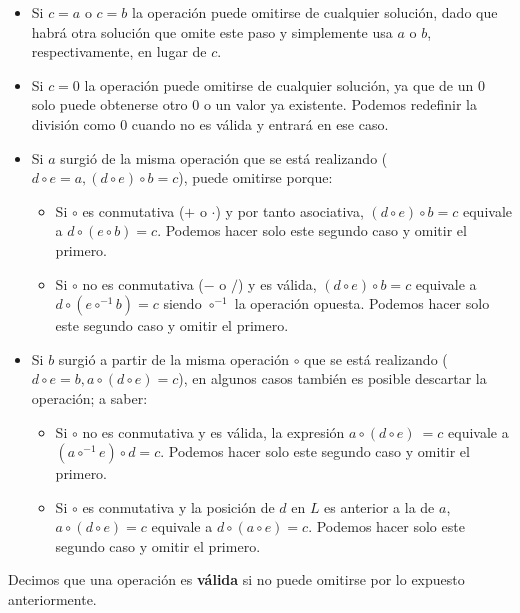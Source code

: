 \begin{itemize}
	\item Si $c = a$ o $c = b$ la operación puede omitirse de cualquier solución,
	dado que habrá otra solución que omite este paso y simplemente usa $a$ o $b$,
	respectivamente, en lugar de $c$.
	\item Si $c = 0$ la operación puede omitirse de cualquier solución, ya que de
	un 0 solo puede obtenerse otro 0 o un valor ya existente. Podemos redefinir
	la división como 0 cuando no es válida y entrará en ese caso.
	\item Si $a$ surgió de la misma operación que se está realizando
  ($d \circ e = a, (d \circ e) \circ b = c$),
  puede omitirse porque:
	\begin{itemize}
		\item Si $\circ$ es conmutativa ($+$ o $\cdot$) y por tanto asociativa,
		$(d \circ e) \circ b = c$ equivale a $d \circ (e \circ b) = c$.
		Podemos hacer solo este segundo caso y omitir el primero.
		\item Si $\circ$ no es conmutativa ($-$ o $/$) y es válida,
		$(d \circ e) \circ b = c$ equivale a $d \circ (e \circ^{-1} b) = c$
		siendo $\circ^{-1}$ la operación opuesta. Podemos hacer solo este segundo caso y omitir el primero.
	\end{itemize}
	\item Si $b$ surgió a partir de la misma operación $\circ$ que se está realizando
	($d \circ e = b, a \circ (d \circ e) = c$),
	en algunos casos también es posible descartar la operación; a saber:
	\begin{itemize}
		\item Si $\circ$ no es conmutativa y es válida, la expresión
		$a \circ (d \circ e)\ = c$ equivale a $(a \circ^{-1} e) \circ d = c$.
		Podemos hacer solo este segundo caso y omitir el primero.
		\item Si $\circ$ es conmutativa y la posición de $d$ en $L$ es anterior a la
		 de $a$, $a \circ (d \circ e) = c$	equivale a $d \circ (a \circ e) = c$.
		Podemos hacer solo este segundo caso y omitir el primero.
	\end{itemize}
\end{itemize}

Decimos que una operación es \textbf{válida} si no puede omitirse por lo
expuesto anteriormente.
